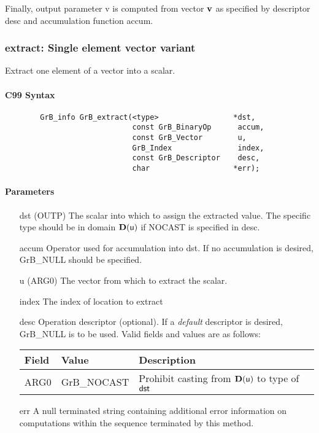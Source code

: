 Finally, output parameter {\sf v} is computed from vector ${\bf v}$ as
specified by descriptor {\sf desc} and accumulation function {\sf accum}.

\subsubsection{{\sf extract}: Single element vector variant}
\label{Sec:extract_single_element_vec}

Extract one element of a vector into a scalar. 

\paragraph{C99 Syntax}

\begin{verbatim}
        GrB_info GrB_extract(<type>                 *dst,
                             const GrB_BinaryOp      accum,
                             const GrB_Vector        u,
                             GrB_Index               index,
                             const GrB_Descriptor    desc,
                             char                   *err); 
\end{verbatim}

\paragraph{Parameters}

\begin{itemize}[leftmargin=1in]
    \item[{\sf dst}]   ({\sf OUTP}) The scalar into which to assign the extracted value.  The specific type should be in domain $\bold{D}({\sf u})$ if {\sf NOCAST} is specified in {\sf desc}.
    \item[{\sf accum}] Operator used for accumulation into dst. If no accumulation is desired,
                        {\sf GrB\_NULL} should be specified.
    \item[{\sf u}]   ({\sf ARG0}) The vector from which to extract the scalar.
    \item[{\sf index}]   The index of location to extract

    \item[{\sf desc}]   Operation descriptor (optional). If a
    \emph{default} descriptor is desired, {\sf GrB\_NULL} is to be
    used.  Valid fields and values are as follows: \\
    \begin{tabular}{lll}
    Field  & Value & Description \\
    \hline
    {\sf ARG0} & {\sf GrB\_NOCAST} & Prohibit casting from $\bold{D}({\sf u})$ to type of ${\sf dst}$ \\
    \end{tabular}
    \item[{\sf err}]     A null terminated string containing additional error
                         information on computations within the sequence 
                         terminated by this method. 

\end{itemize}

